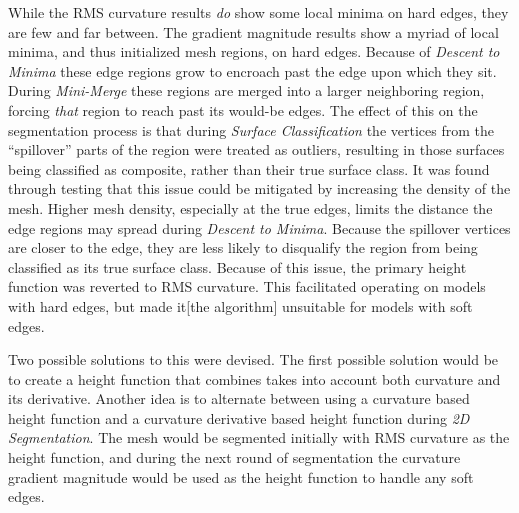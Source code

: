 While the RMS curvature results \textit{do} show some local minima on hard edges, they are few and far between.
The gradient magnitude results show a myriad of local minima, and thus initialized mesh regions, on hard edges.
Because of \textit{Descent to Minima} these edge regions grow to encroach past the edge upon which they sit.
During \textit{Mini-Merge} these regions are merged into a larger neighboring region, forcing \textit{that} region to reach past its would-be edges.
The effect of this on the segmentation process is that during \textit{Surface Classification} the vertices from the ``spillover'' parts of the region were treated as outliers, resulting in those surfaces being classified as composite, rather than their true surface class.
It was found through testing that this issue could be mitigated by increasing the density of the mesh.
Higher mesh density, especially at the true edges, limits the distance the edge regions may spread during \textit{Descent to Minima}.
Because the spillover vertices are closer to the edge, they are less likely to disqualify the region from being classified as its true surface class.
Because of this issue, the primary height function was reverted to RMS curvature.
This facilitated operating on models with hard edges, but made it[the algorithm] unsuitable for models with soft edges.

Two possible solutions to this were devised.
The first possible solution would be to create a height function that combines takes into account both curvature and its derivative.
Another idea is to alternate between using a curvature based height function and a curvature derivative based height function during \textit{2D Segmentation}.
The mesh would be segmented initially with RMS curvature as the height function, and during the next round of segmentation the curvature gradient magnitude would be used as the height function to handle any soft edges.

